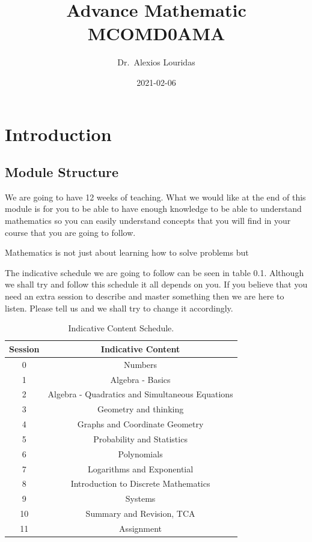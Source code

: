 \documentclass[
]{book}
\title{Advance Mathematic MCOMD0AMA}
\author{Dr.~Alexios Louridas}
\date{2021-02-06}
\begin{document}
\maketitle

{
\setcounter{tocdepth}{1}
\tableofcontents
}
\hypertarget{introduction}{%
\chapter*{Introduction}\label{introduction}}

\hypertarget{module-structure}{%
\section*{Module Structure}\label{module-structure}}

We are going to have 12 weeks of teaching. What we would like at the end of this module is for you to be able to have enough knowledge to be able to understand mathematics so you can easily understand concepts that you will find in your course that you are going to follow.

Mathematics is not just about learning how to solve problems but

The indicative schedule we are going to follow can be seen in table 0.1. Although we shall try and follow this schedule it all depends on you. If you believe that you need an extra session to describe and master something then we are here to listen. Please tell us and we shall try to change it accordingly.

\begin{table}

\caption{\label{tab:unnamed-chunk-1}Indicative Content Schedule.}
\centering
\begin{tabular}[t]{c|c}
\hline
Session & Indicative Content\\
\hline
0 & Numbers\\
\hline
1 & Algebra - Basics\\
\hline
2 & Algebra - Quadratics and Simultaneous Equations\\
\hline
3 & Geometry and thinking\\
\hline
4 & Graphs and Coordinate Geometry\\
\hline
5 & Probability and Statistics\\
\hline
6 & Polynomials\\
\hline
7 & Logarithms and Exponential\\
\hline
8 & Introduction to Discrete Mathematics\\
\hline
9 & Systems\\
\hline
10 & Summary and Revision, TCA\\
\hline
11 & Assignment\\
\hline
\end{tabular}
\end{table}
\end{document}
